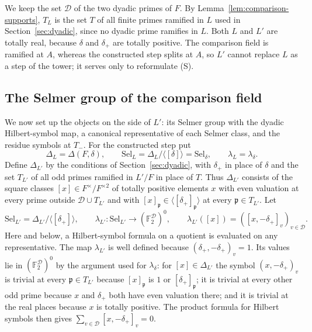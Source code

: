 \documentclass[11pt]{article}
\theoremstyle{plain}
\theoremstyle{definition}
\theoremstyle{remark}
\newcommand{\F}{\mathbb F}
\begin{document}
We keep the set $\mathcal D$ of the two dyadic primes of $F$.  By
Lemma~\ref{lem:comparison-supports}, $T_L$ is the set $T$ of all finite
primes ramified in $L$ used in Section~\ref{sec:dyadic}, since no dyadic
prime ramifies in $L$.  Both $L$ and $L'$ are totally real, because
$\delta$ and $\delta_+$ are totally positive.  The comparison field is
ramified at $A$, whereas the constructed step splits at $A$, so $L'$
cannot replace $L$ as a step of the tower; it serves only to reformulate
(S).

\subsection{The Selmer group of the comparison field}\label{sec:comparison-selmer}

We now set up the objects on the side of $L'$: its Selmer group with the
dyadic Hilbert-symbol map, a canonical representative of each Selmer class,
and the residue symbols at $T_-$.  For the constructed step put
\[
 \Delta_L=\Delta(F,\delta),\qquad
 \mathrm{Sel}_L=\Delta_L/\langle[\delta]\rangle=\mathrm{Sel}_\delta,
 \qquad \lambda_L=\lambda_\delta.
\]
Define $\Delta_{L'}$ by the conditions of Section~\ref{sec:dyadic}, with
$\delta_+$ in place of $\delta$ and the set $T_{L'}$ of all odd primes
ramified in $L'/F$ in place of $T$.  Thus $\Delta_{L'}$ consists of the
square classes $[x]\in F^\times/F^{\times2}$ of totally positive elements
$x$ with even valuation at every prime outside $\mathcal D\cup T_{L'}$ and
with $[x]_{\mathfrak p}\in\langle[\delta_+]_{\mathfrak p}\rangle$ at every
$\mathfrak p\in T_{L'}$.  Let
\[
 \mathrm{Sel}_{L'}=\Delta_{L'}/\langle[\delta_+]\rangle,
 \qquad \lambda_{L'}:\mathrm{Sel}_{L'}\longrightarrow (\F_2^{\mathcal D})^0,
 \qquad \lambda_{L'}([x])=([x,-\delta_+]_v)_{v\in \mathcal D}.
\]
Here and below, a Hilbert-symbol formula on a quotient is evaluated on any
representative.  The map $\lambda_{L'}$ is well defined because
$(\delta_+,-\delta_+)_v=1$.  Its values lie in $(\F_2^{\mathcal D})^0$ by
the argument used for $\lambda_\delta$: for $[x]\in\Delta_{L'}$ the symbol
$(x,-\delta_+)_v$ is trivial at every $\mathfrak p\in T_{L'}$ because
$[x]_{\mathfrak p}$ is $1$ or $[\delta_+]_{\mathfrak p}$; it is trivial at
every other odd prime because $x$ and $\delta_+$ both have even valuation
there; and it is trivial at the real places because $x$ is totally
positive.  The product formula for Hilbert symbols \cite[Chapter~V,
Example~5.4]{MilneCFT} then gives $\sum_{v\in\mathcal
D}[x,-\delta_+]_v=0$.
\end{document}
